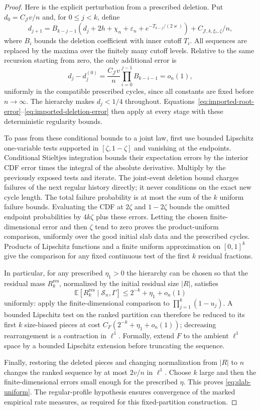\documentclass[11pt]{article}
\numberwithin{equation}{section}
\newcommand{\E}{\mathbb E}
\theoremstyle{definition}
\theoremstyle{remark}
\begin{document}
\begin{proof}
Here is the explicit perturbation from a prescribed deletion.  Put
$d_0=C_{\mathcal J}v/n$ and, for $0\le j<k$, define
\begin{equation}\label{eq:finite-deletion-recursion}
 d_{j+1}=B_{k-j-1}
 (d_j+2h+\chi_n+\varepsilon_n+e^{-T_{k-j}/(2\varkappa)})
 +C_{\mathcal J,k,\xi_*,\zeta}/n,
\end{equation}
where $B_i$ bounds the deletion coefficient with inner cutoff $T_i$.
All sequences are replaced by the maxima over the finitely many cutoff
levels.  Relative to the same recursion starting from zero, the only
additional error is
\[
 d_j-d_j^{(0)}
 =\frac{C_{\mathcal J}v}{n}
   \prod_{i=0}^{j-1}B_{k-i-1}=o_n(1),
\]
uniformly in the compatible prescribed cycles, since all constants are
fixed before $n\to\infty$.  The hierarchy makes $d_j<1/4$ throughout.
Equations~\eqref{eq:imported-root-error}--\eqref{eq:imported-deletion-error}
then apply at every stage with these deterministic regularity bounds.

To pass from these conditional bounds to a joint law, first use bounded
Lipschitz one-variable tests supported in $[\zeta,1-\zeta]$ and vanishing
at the endpoints.  Conditional Stieltjes integration bounds their
expectation errors by the interior CDF error times the integral of the
absolute derivative.  Multiply by the previously exposed tests and
iterate.  The joint-event deletion bound charges failures of the next
regular history directly; it never conditions on the exact new cycle
length.  The total failure probability is at most the sum of the $k$
uniform failure bounds.  Evaluating the CDF at $2\zeta$ and $1-2\zeta$
bounds the omitted endpoint probabilities by $4k\zeta$ plus these errors.
Letting the chosen finite-dimensional error and then $\zeta$ tend to zero
proves the product-uniform comparison, uniformly over the good initial
slab data and the prescribed cycles.  Products of Lipschitz functions
and a finite uniform approximation on $[0,1]^k$ give the comparison for
any fixed continuous test of the first $k$ residual fractions.

In particular, for any prescribed $\eta_1>0$ the hierarchy can be chosen
so that the residual mass $R_k^{\mathrm{res}}$, normalized by the
initial residual size $|R|$, satisfies
\[
 \E[R_k^{\mathrm{res}}\mid\mathscr S_n,\Gamma]
 \le 2^{-k}+\eta_1+o_n(1)
\]
uniformly: apply the finite-dimensional comparison to
$\prod_{j=1}^k(1-u_j)$.
A bounded Lipschitz test on the ranked partition can therefore be reduced
to its first $k$ size-biased pieces at cost
$C_F(2^{-k}+\eta_1+o_n(1))$; decreasing rearrangement is a contraction in
$\ell^1$.  Formally, extend $F$ to the ambient $\ell^1$ space by a bounded
Lipschitz extension before truncating the sequence.

Finally, restoring the deleted pieces and changing normalization from
$|R|$ to $n$ changes the ranked sequence by at most $2v/n$ in $\ell^1$.
Choose $k$ large and then the finite-dimensional errors small enough for
the prescribed $\eta$.  This proves \eqref{eq:slab-uniform}.
The regular-profile hypothesis ensures convergence of the marked empirical
rate measures, as required for this fixed-partition construction.
\end{proof}
\end{document}
